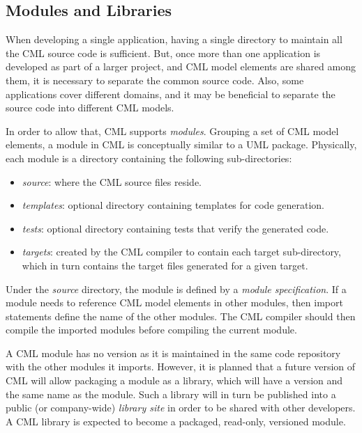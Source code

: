 \subsection{Modules and Libraries}\label{subsec:modlib}

When developing a single application,
having a single directory to maintain all the CML source code is sufficient.
But, once more than one application is developed as part of a larger project,
and CML model elements are shared among them,
it is necessary to separate the common source code.
Also, some applications cover different domains,
and it may be beneficial to separate the source code into different CML models.

In order to allow that, CML supports \emph{modules}.
Grouping a set of CML model elements,
a module in CML is conceptually similar to a UML \cite{uml} package.
Physically, each module is a directory containing the following sub-directories:

\begin{itemize}
\item \emph{source}: where the CML source files reside.
\item \emph{templates}: optional directory containing templates for code generation.
\item \emph{tests}: optional directory containing tests that verify the generated code.
\item \emph{targets}: created by the CML compiler to contain each target sub-directory,
which in turn contains the target files generated for a given target.
\end{itemize}

Under the \emph{source} directory, the module is defined by a \emph{module specification}.
If a module needs to reference CML model elements in other modules,
then import statements define the name of the other modules.
The CML compiler should then compile the imported modules
before compiling the current module.

A CML module has no version
as it is maintained in the same code repository with the other modules it imports.
However, it is planned that a future version of CML will allow packaging a module as a library,
which will have a version and the same name as the module.
Such a library will in turn be published into a public (or company-wide) \emph{library site}
in order to be shared with other developers.
A CML library is expected to become a packaged, read-only, versioned module.
